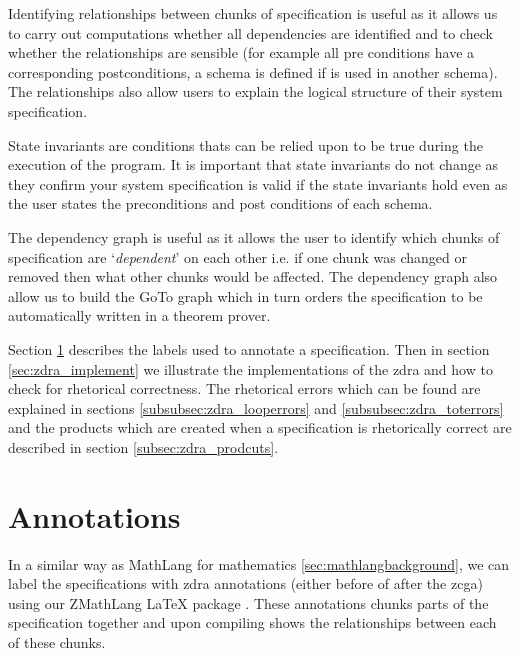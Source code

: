 Identifying relationships between chunks of specification is useful as it allows
us to carry out computations whether all dependencies are identified and to
check whether the relationships are sensible (for example all pre conditions
have a corresponding postconditions, a schema is defined if is used in another
schema). The relationships also allow users to explain the logical structure of
their system specification.

State invariants are conditions thats can be relied upon to be true during the
execution of the program. It is important that state invariants do not change as
they confirm your system specification is valid if the state invariants hold
even as the user states the preconditions and post conditions of each schema. 

The dependency graph is useful as it allows the user to identify which chunks of
specification are `\textit{dependent}' on each other i.e. if one chunk was
changed or removed then what other chunks would be affected. The dependency
graph also allow us to build the GoTo graph which in turn orders the
specification to be automatically written in a theorem prover.

Section \ref{sec:zdra_annotate} describes the labels used to annotate a
specification. Then in section \ref{sec:zdra_implement} we illustrate the
implementations of the \gls{zdra} and how to check for rhetorical correctness.
The rhetorical errors which can be found are explained in sections
\ref{subsubsec:zdra_looperrors} and \ref{subsubsec:zdra_toterrors} and the
products which are created when a specification is rhetorically correct are
described in section \ref{subsec:zdra_prodcuts}.

\section{Annotations}
\label{sec:zdra_annotate}

In a similar way as  MathLang for mathematics \ref{sec:mathlangbackground}, we can label the specifications with
\gls{zdra} annotations (either before of after the \gls{zcga}) using our ZMathLang \LaTeX{} package . These
annotations chunks parts of the specification together and upon compiling shows
the relationships between each of these chunks.

